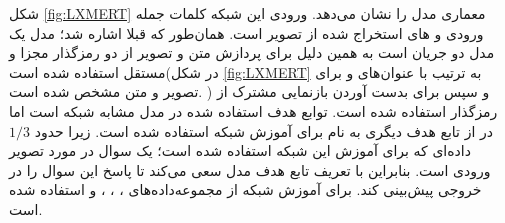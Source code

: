	شکل 
	\ref{fig:LXMERT}
	معماری مدل
	را نشان می‌دهد. ورودی این شبکه کلمات جمله ورودی و 
	های استخراج شده از تصویر است. همان‌طور که قبلا اشاره شد؛ مدل
	یک مدل دو جریان است به همین دلیل برای پردازش متن و تصویر از دو رمزگذار مجزا و مستقل استفاده شده است(در شکل 
	\ref{fig:LXMERT}
	به ترتیب با عنوان‌های  
	و 
	برای تصویر و متن مشخص شده است.
	) و سپس برای بدست آوردن بازنمایی مشترک از رمزگذار
	استفاده شده است. توابع هدف استفاده شده در مدل
	مشابه شبکه 
	است اما در 
	از تابع هدف دیگری به نام 
	برای آموزش شبکه استفاده شده است. زیرا حدود $1/3$ داده‌ای که برای آموزش این شبکه استفاده شده است؛ یک سوال در مورد تصویر ورودی است. بنابراین با تعریف تابع هدف 
	مدل سعی ‌می‌کند تا پاسخ این سوال را در خروجی پیش‌بینی کند. برای آموزش شبکه
	از مجموعه‌داده‌های 
	،
	،
	،
	و
	استفاده شده است.
